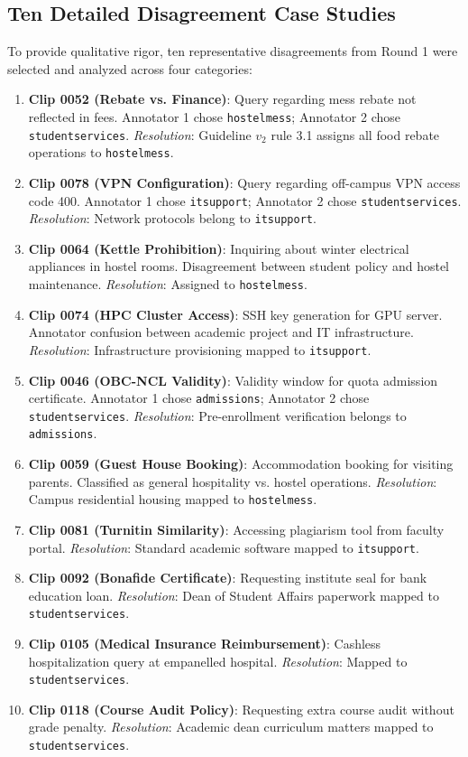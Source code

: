 \documentclass[10pt,a4paper,twocolumn]{article}
\renewcommand{\_}{\origunderscore\hspace{0pt}}
\begin{document}
\subsection{Ten Detailed Disagreement Case Studies}
To provide qualitative rigor, ten representative disagreements from Round 1 were selected and analyzed across four categories:
\begin{enumerate}
    \item \textbf{Clip 0052 (Rebate vs. Finance)}: Query regarding mess rebate not reflected in fees. Annotator 1 chose \texttt{hostel\_mess}; Annotator 2 chose \texttt{student\_services}. \textit{Resolution}: Guideline $v_2$ rule 3.1 assigns all food rebate operations to \texttt{hostel\_mess}.
    \item \textbf{Clip 0078 (VPN Configuration)}: Query regarding off-campus VPN access code 400. Annotator 1 chose \texttt{it\_support}; Annotator 2 chose \texttt{student\_services}. \textit{Resolution}: Network protocols belong to \texttt{it\_support}.
    \item \textbf{Clip 0064 (Kettle Prohibition)}: Inquiring about winter electrical appliances in hostel rooms. Disagreement between student policy and hostel maintenance. \textit{Resolution}: Assigned to \texttt{hostel\_mess}.
    \item \textbf{Clip 0074 (HPC Cluster Access)}: SSH key generation for GPU server. Annotator confusion between academic project and IT infrastructure. \textit{Resolution}: Infrastructure provisioning mapped to \texttt{it\_support}.
    \item \textbf{Clip 0046 (OBC-NCL Validity)}: Validity window for quota admission certificate. Annotator 1 chose \texttt{admissions}; Annotator 2 chose \texttt{student\_services}. \textit{Resolution}: Pre-enrollment verification belongs to \texttt{admissions}.
    \item \textbf{Clip 0059 (Guest House Booking)}: Accommodation booking for visiting parents. Classified as general hospitality vs. hostel operations. \textit{Resolution}: Campus residential housing mapped to \texttt{hostel\_mess}.
    \item \textbf{Clip 0081 (Turnitin Similarity)}: Accessing plagiarism tool from faculty portal. \textit{Resolution}: Standard academic software mapped to \texttt{it\_support}.
    \item \textbf{Clip 0092 (Bonafide Certificate)}: Requesting institute seal for bank education loan. \textit{Resolution}: Dean of Student Affairs paperwork mapped to \texttt{student\_services}.
    \item \textbf{Clip 0105 (Medical Insurance Reimbursement)}: Cashless hospitalization query at empanelled hospital. \textit{Resolution}: Mapped to \texttt{student\_services}.
    \item \textbf{Clip 0118 (Course Audit Policy)}: Requesting extra course audit without grade penalty. \textit{Resolution}: Academic dean curriculum matters mapped to \texttt{student\_services}.
\end{enumerate}
\end{document}
